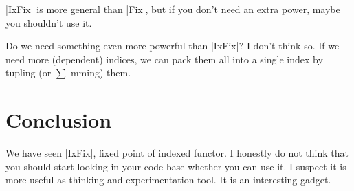 |IxFix| is more general than |Fix|, but if you don't need
an extra power, maybe you shouldn't use it.

Do we need something even more powerful than |IxFix|?
I don't think so. If we need more (dependent) indices, we can pack them all into
a single index by tupling (or $\sum$-mming) them.

\section{Conclusion}

We have seen |IxFix|, fixed point of indexed functor.
I honestly do not think that you should start looking in your code base whether you can use it.
I suspect it is more useful as thinking and experimentation tool.
It is an interesting gadget.
